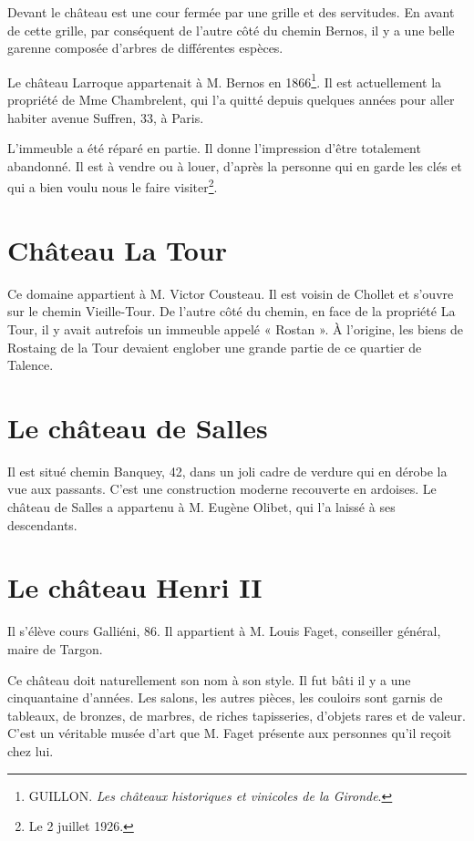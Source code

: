 Devant le château est une cour fermée par une grille et des servitudes. En avant de cette grille, par conséquent de l'autre côté du chemin Bernos, il y a une belle garenne composée d'arbres de différentes espèces.

Le château Larroque appartenait à M. Bernos en 1866\footnote{GUILLON. \textit{Les châteaux historiques et vinicoles de la Gironde}.}. Il est actuellement la propriété de Mme Chambrelent, qui l'a quitté depuis quelques années pour aller habiter avenue Suffren, 33, à Paris.

L'immeuble a été réparé en partie. Il donne l'impression d'être totalement abandonné. Il est à vendre ou à louer, d'après la personne qui en garde les clés et qui a bien voulu nous le faire visiter\footnote{Le 2 juillet 1926.}.

\section{Château La Tour}

Ce domaine appartient à M. Victor Cousteau. Il est voisin de Chollet et s'ouvre sur le chemin Vieille-Tour. De l'autre côté du chemin, en face de la propriété La Tour, il y avait autrefois un immeuble appelé « Rostan ». À l'origine, les biens de Rostaing de la Tour devaient englober une grande partie de ce quartier de Talence. 

\section{Le château de Salles}

Il est situé chemin Banquey, 42, dans un joli cadre de verdure qui en dérobe la vue aux passants. C'est une construction moderne recouverte en ardoises. Le château de Salles a appartenu à M. Eugène Olibet, qui l'a laissé à ses descendants.

\section{Le château Henri II}

Il s'élève cours Galliéni, 86. Il appartient à M. Louis Faget, conseiller général, maire de Targon.

Ce château doit naturellement son nom à son style. Il fut bâti il y a une cinquantaine d'années. Les salons, les autres pièces, les couloirs sont garnis de tableaux, de bronzes, de marbres, de riches tapisseries, d'objets rares et de valeur. C'est un véritable musée d'art que M. Faget présente aux personnes qu'il reçoit chez lui.

